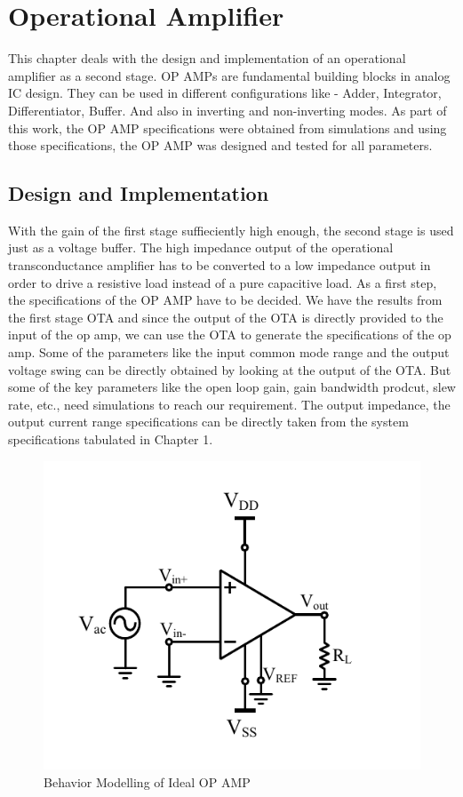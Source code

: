 \chapter{Operational Amplifier}
This chapter deals with the design and implementation of an operational amplifier as a second stage. OP AMPs are fundamental building blocks in analog IC design. They can be used in different configurations like - Adder, Integrator, Differentiator, Buffer. And also in inverting and non-inverting modes. As part of this work, the OP AMP specifications were obtained from simulations and using those specifications, the OP AMP was designed and tested for all parameters.
 
\section{Design and Implementation}
With the gain of the first stage suffieciently high enough, the second stage is used just as a voltage buffer. The high impedance output of the operational transconductance amplifier has to be converted to a low impedance output in order to drive a resistive load instead of a pure capacitive load. As a first step, the specifications of the OP AMP have to be decided. We have the results from the first stage OTA and since the output of the OTA is directly provided to the input of the op amp, we can use the OTA to generate the specifications of the op amp. Some of the parameters like the input common mode range and the output voltage swing can be directly obtained by looking at the output of the OTA. But some of the key parameters like the open loop gain, gain bandwidth prodcut, slew rate, etc., need simulations to reach our requirement. The output impedance, the output current range specifications can be directly taken from the system specifications tabulated in Chapter 1.

\begin{figure} [H]
\centering
\includegraphics[scale=1]{Figures/System_Level/ahdl_OPAMP.pdf}
\caption{Behavior Modelling of Ideal OP AMP}
\label{fig:ahdlopamp}
\end{figure}

